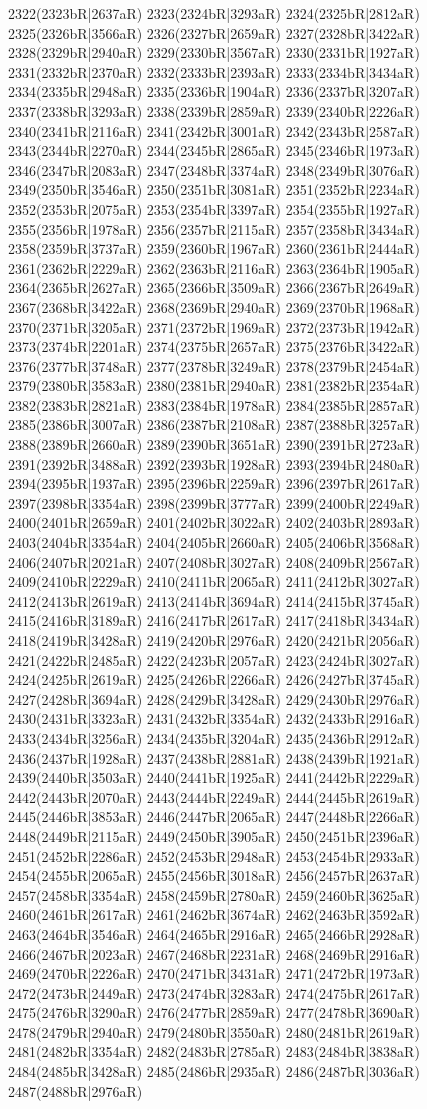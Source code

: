 2322(2323bR|2637aR) 2323(2324bR|3293aR) 2324(2325bR|2812aR) 2325(2326bR|3566aR) 2326(2327bR|2659aR) 2327(2328bR|3422aR) 2328(2329bR|2940aR) 2329(2330bR|3567aR) 2330(2331bR|1927aR) 2331(2332bR|2370aR) 2332(2333bR|2393aR) 2333(2334bR|3434aR) 2334(2335bR|2948aR) 2335(2336bR|1904aR) 2336(2337bR|3207aR) 2337(2338bR|3293aR) 2338(2339bR|2859aR) 2339(2340bR|2226aR) 2340(2341bR|2116aR) 2341(2342bR|3001aR) 2342(2343bR|2587aR) 2343(2344bR|2270aR) 2344(2345bR|2865aR) 2345(2346bR|1973aR) 2346(2347bR|2083aR) 2347(2348bR|3374aR) 2348(2349bR|3076aR) 2349(2350bR|3546aR) 2350(2351bR|3081aR) 2351(2352bR|2234aR) 2352(2353bR|2075aR) 2353(2354bR|3397aR) 2354(2355bR|1927aR) 2355(2356bR|1978aR) 2356(2357bR|2115aR) 2357(2358bR|3434aR) 2358(2359bR|3737aR) 2359(2360bR|1967aR) 2360(2361bR|2444aR) 2361(2362bR|2229aR) 2362(2363bR|2116aR) 2363(2364bR|1905aR) 2364(2365bR|2627aR) 2365(2366bR|3509aR) 2366(2367bR|2649aR) 2367(2368bR|3422aR) 2368(2369bR|2940aR) 2369(2370bR|1968aR) 2370(2371bR|3205aR) 2371(2372bR|1969aR) 2372(2373bR|1942aR) 2373(2374bR|2201aR) 2374(2375bR|2657aR) 2375(2376bR|3422aR) 2376(2377bR|3748aR) 2377(2378bR|3249aR) 2378(2379bR|2454aR) 2379(2380bR|3583aR) 2380(2381bR|2940aR) 2381(2382bR|2354aR) 2382(2383bR|2821aR) 2383(2384bR|1978aR) 2384(2385bR|2857aR) 2385(2386bR|3007aR) 2386(2387bR|2108aR) 2387(2388bR|3257aR) 2388(2389bR|2660aR) 2389(2390bR|3651aR) 2390(2391bR|2723aR) 2391(2392bR|3488aR) 2392(2393bR|1928aR) 2393(2394bR|2480aR) 2394(2395bR|1937aR) 2395(2396bR|2259aR) 2396(2397bR|2617aR) 2397(2398bR|3354aR) 2398(2399bR|3777aR) 2399(2400bR|2249aR) 2400(2401bR|2659aR) 2401(2402bR|3022aR) 2402(2403bR|2893aR) 2403(2404bR|3354aR) 2404(2405bR|2660aR) 2405(2406bR|3568aR) 2406(2407bR|2021aR) 2407(2408bR|3027aR) 2408(2409bR|2567aR) 2409(2410bR|2229aR) 2410(2411bR|2065aR) 2411(2412bR|3027aR) 2412(2413bR|2619aR) 2413(2414bR|3694aR) 2414(2415bR|3745aR) 2415(2416bR|3189aR) 2416(2417bR|2617aR) 2417(2418bR|3434aR) 2418(2419bR|3428aR) 2419(2420bR|2976aR) 2420(2421bR|2056aR) 2421(2422bR|2485aR) 2422(2423bR|2057aR) 2423(2424bR|3027aR) 2424(2425bR|2619aR) 2425(2426bR|2266aR) 2426(2427bR|3745aR) 2427(2428bR|3694aR) 2428(2429bR|3428aR) 2429(2430bR|2976aR) 2430(2431bR|3323aR) 2431(2432bR|3354aR) 2432(2433bR|2916aR) 2433(2434bR|3256aR) 2434(2435bR|3204aR) 2435(2436bR|2912aR) 2436(2437bR|1928aR) 2437(2438bR|2881aR) 2438(2439bR|1921aR) 2439(2440bR|3503aR) 2440(2441bR|1925aR) 2441(2442bR|2229aR) 2442(2443bR|2070aR) 2443(2444bR|2249aR) 2444(2445bR|2619aR) 2445(2446bR|3853aR) 2446(2447bR|2065aR) 2447(2448bR|2266aR) 2448(2449bR|2115aR) 2449(2450bR|3905aR) 2450(2451bR|2396aR) 2451(2452bR|2286aR) 2452(2453bR|2948aR) 2453(2454bR|2933aR) 2454(2455bR|2065aR) 2455(2456bR|3018aR) 2456(2457bR|2637aR) 2457(2458bR|3354aR) 2458(2459bR|2780aR) 2459(2460bR|3625aR) 2460(2461bR|2617aR) 2461(2462bR|3674aR) 2462(2463bR|3592aR) 2463(2464bR|3546aR) 2464(2465bR|2916aR) 2465(2466bR|2928aR) 2466(2467bR|2023aR) 2467(2468bR|2231aR) 2468(2469bR|2916aR) 2469(2470bR|2226aR) 2470(2471bR|3431aR) 2471(2472bR|1973aR) 2472(2473bR|2449aR) 2473(2474bR|3283aR) 2474(2475bR|2617aR) 2475(2476bR|3290aR) 2476(2477bR|2859aR) 2477(2478bR|3690aR) 2478(2479bR|2940aR) 2479(2480bR|3550aR) 2480(2481bR|2619aR) 2481(2482bR|3354aR) 2482(2483bR|2785aR) 2483(2484bR|3838aR) 2484(2485bR|3428aR) 2485(2486bR|2935aR) 2486(2487bR|3036aR) 2487(2488bR|2976aR) 